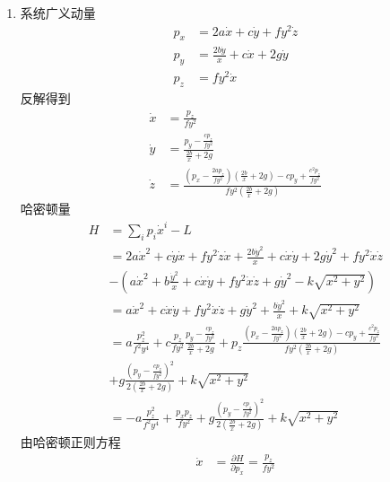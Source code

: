 \begin{solution}
    \begin{enumerate}[label=(\arabic*)]
    \item 系统广义动量
    \begin{align*}
        p_x&=2a\dot x+c\dot y+fy^2\dot z\\
        p_y&=\frac{2b\dot y}{x}+c\dot x+2g\dot y\\
        p_z&=fy^2\dot x
    \end{align*}
    反解得到
    \begin{align*}
        \dot x&=\frac{p_z}{fy^2}\\
        \dot y&=\frac{p_y-\frac{cp_z}{fy^2}}{\frac{2b}{x}+2g}\\
        \dot z&=\frac{(p_x-\frac{2ap_z}{fy^2})(\frac{2b}{x}+2g)-cp_y+\frac{c^2p_z}{fy^2}}{fy^2(\frac{2b}{x}+2g)}
    \end{align*}
    哈密顿量
    \begin{align*}
        H&=\sum_{i}p_i\dot x^i-L\\&=2a\dot x^2+c\dot y\dot x+fy^2\dot z\dot x+\frac{2b\dot y^2}{x}+c\dot x\dot y+2g\dot y^2+fy^2\dot x\dot z\\&-(a\dot x^2+b\frac{\dot y^2}{x}+c\dot x\dot y+fy^2\dot x\dot z+g\dot y^2-k\sqrt{x^2+y^2})\\&=a\dot x^2+c\dot x\dot y+fy^2\dot x\dot z+g\dot y^2+\frac{b\dot y^2}{x}+k\sqrt{x^2+y^2}\\&=a\frac{p_z^2}{f^2y^4}+c\frac{p_z}{fy^2}\frac{p_y-\frac{cp_z}{fy^2}}{\frac{2b}{x}+2g}+p_z\frac{(p_x-\frac{2ap_z}{fy^2})(\frac{2b}{x}+2g)-cp_y+\frac{c^2p_z}{fy^2}}{fy^2(\frac{2b}{x}+2g)}\\&+g\frac{(p_y-\frac{cp_z}{fy^2})^2}{2(\frac{2b}{x}+2g)}+k\sqrt{x^2+y^2}\\&=-a\frac{p_z^2}{f^2y^4}+\frac{p_xp_z}{fy^2}+g\frac{(p_y-\frac{cp_z}{fy^2})^2}{2(\frac{2b}{x}+2g)}+k\sqrt{x^2+y^2}
    \end{align*}
    由哈密顿正则方程
    \begin{align*}
        \dot x&=\frac{\partial H}{\partial p_x}=\frac{p_z}{fy^2}\\

\end{align*}
\end{enumerate}
\end{solution}

